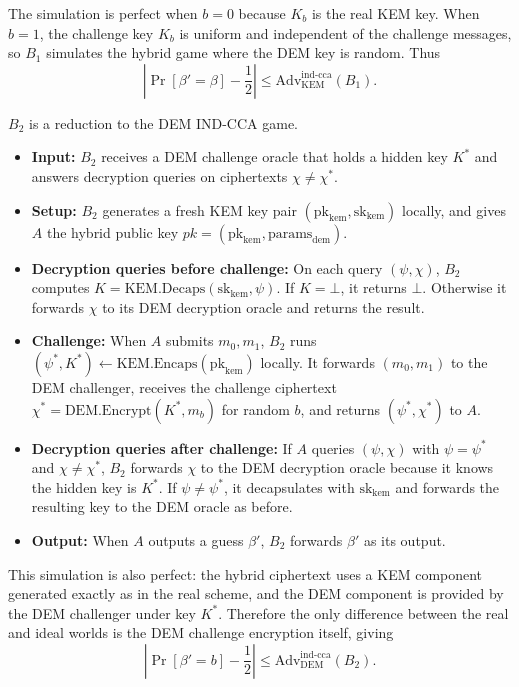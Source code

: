 The simulation is perfect when $b = 0$ because $K_b$ is the real KEM key. When $b = 1$, the challenge key $K_b$ is uniform and independent of the challenge messages, so $B_1$ simulates the hybrid game where the DEM key is random. Thus
$$
\left|\Pr[\beta' = \beta] - \frac{1}{2}\right| \le \text{Adv}_{\text{KEM}}^{\text{ind-cca}}(B_1).
$$

$B_2$ is a reduction to the DEM IND-CCA game.
\begin{itemize}
    \item \textbf{Input:} $B_2$ receives a DEM challenge oracle that holds a hidden key $K^*$ and answers decryption queries on ciphertexts $\chi \neq \chi^*$.
    \item \textbf{Setup:} $B_2$ generates a fresh KEM key pair $(\text{pk}_{\text{kem}}, \text{sk}_{\text{kem}})$ locally, and gives $A$ the hybrid public key $pk = (\text{pk}_{\text{kem}}, \text{params}_{\text{dem}})$.
    \item \textbf{Decryption queries before challenge:} On each query $(\psi, \chi)$, $B_2$ computes $K = \text{KEM.Decaps}(\text{sk}_{\text{kem}}, \psi)$. If $K = \bot$, it returns $\bot$. Otherwise it forwards $\chi$ to its DEM decryption oracle and returns the result.
    \item \textbf{Challenge:} When $A$ submits $m_0, m_1$, $B_2$ runs $(\psi^*, K^*) \gets \text{KEM.Encaps}(\text{pk}_{\text{kem}})$ locally. It forwards $(m_0, m_1)$ to the DEM challenger, receives the challenge ciphertext $\chi^* = \text{DEM.Encrypt}(K^*, m_b)$ for random $b$, and returns $(\psi^*, \chi^*)$ to $A$.
    \item \textbf{Decryption queries after challenge:} If $A$ queries $(\psi, \chi)$ with $\psi = \psi^*$ and $\chi \neq \chi^*$, $B_2$ forwards $\chi$ to the DEM decryption oracle because it knows the hidden key is $K^*$. If $\psi \neq \psi^*$, it decapsulates with $\text{sk}_{\text{kem}}$ and forwards the resulting key to the DEM oracle as before.
    \item \textbf{Output:} When $A$ outputs a guess $\beta'$, $B_2$ forwards $\beta'$ as its output.
\end{itemize}

This simulation is also perfect: the hybrid ciphertext uses a KEM component generated exactly as in the real scheme, and the DEM component is provided by the DEM challenger under key $K^*$. Therefore the only difference between the real and ideal worlds is the DEM challenge encryption itself, giving
$$
\left|\Pr[\beta' = b] - \frac{1}{2}\right| \le \text{Adv}_{\text{DEM}}^{\text{ind-cca}}(B_2).
$$

